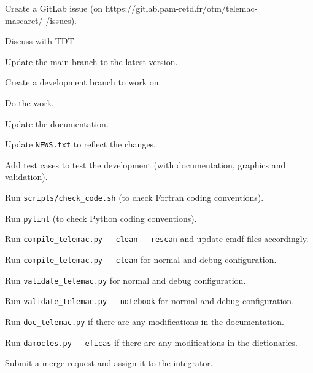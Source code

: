 \begin{todolist}
\setlength\itemsep{0.01em}
\item Create a GitLab issue (on https://gitlab.pam-retd.fr/otm/telemac-mascaret/-/issues).
\item Discuss with TDT\@.
\item Update the main branch to the latest version.
\item Create a development branch to work on.
\item Do the work.
\item Update the documentation.
\item Update \verb!NEWS.txt! to reflect the changes.
\item Add test cases to test the development (with documentation, graphics and
  validation).
\item Run \verb!scripts/check_code.sh! (to check Fortran coding conventions).
\item Run \verb!pylint! (to check Python coding conventions).
\item Run \verb!compile_telemac.py --clean --rescan! and update cmdf files accordingly.
\item Run \verb!compile_telemac.py --clean! for normal and debug configuration.
\item Run \verb!validate_telemac.py! for normal and debug configuration.
\item Run \verb!validate_telemac.py --notebook! for normal and debug configuration.
\item Run \verb!doc_telemac.py! if there are any modifications in the documentation.
\item Run \verb!damocles.py --eficas! if there are any modifications in the
  dictionaries.
\item Submit a merge request and assign it to the integrator.
\end{todolist}
